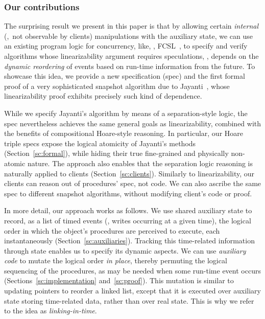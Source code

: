 \subsubsection*{Our contributions}

The surprising result we present in this paper is that by allowing
certain \emph{internal} (\ie,~not observable by clients) manipulations
with the auxiliary state, we can use an existing program logic for
concurrency, like, \eg,
FCSL~\cite{NanevskiLSD+ESOP14,SergeyNB+PLDI15}, to specify and verify
algorithms whose linearizability argument requires speculations, \ie,
depends on the \emph{dynamic reordering} of events based on run-time
information from the future.
%
%
To showcase this idea, we provide a new specification (spec) and the
first formal proof of a very sophisticated snapshot algorithm due to
Jayanti~\cite{Jayanti+STOC05}, whose linearizability proof exhibits
precisely such kind of dependence.

While we specify Jayanti's algorithm by means of a separation-style
logic, the spec nevertheless achieves the same general goals as
linearizability, combined with the benefits of compositional
Hoare-style reasoning.
%
In particular, our Hoare triple specs expose the logical atomicity of
Jayanti's methods (Section~\ref{sc:formal}), while hiding their true
fine-grained and physically non-atomic nature.  The approach also
enables that the separation logic reasoning is naturally applied to
clients (Section~\ref{sc:clients}).
%
%
Similarly to linearizability, our clients can reason out of
procedures' spec, not code. We can also ascribe the same spec to
different snapshot algorithms, without modifying client's code or
proof.


In more detail, our approach works as follows. 
%
We use shared auxiliary state to record, as a list of timed events
(\eg, writes occurring at a given time), the logical order in which
the object's procedures are perceived to execute, each instantaneously
(Section~\ref{sc:auxiliaries}). Tracking this time-related information
through state enables us to specify its dynamic aspects. We can use
\emph{auxiliary code} to mutate the logical order \emph{in place},
thereby permuting the logical sequencing of the procedures, as may be
needed when some run-time event occurs
(Sections~\ref{sc:implementation} and~\ref{sc:proof}). This mutation
is similar to updating pointers to reorder a linked list, except that
it is executed over auxiliary state storing time-related data, rather
than over real state. This is why we refer to the idea as
\emph{linking-in-time}.

